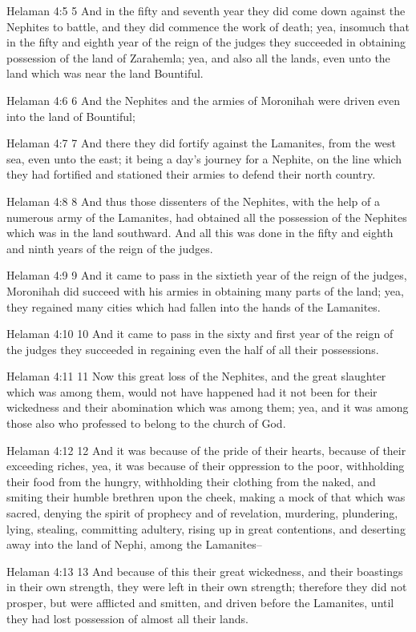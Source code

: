 Helaman 4:5
 5 And in the fifty and seventh year they did come down against
the Nephites to battle, and they did commence the work of death;
yea, insomuch that in the fifty and eighth year of the reign of
the judges they succeeded in obtaining possession of the land of
Zarahemla; yea, and also all the lands, even unto the land which
was near the land Bountiful.

Helaman 4:6
 6 And the Nephites and the armies of Moronihah were driven even
into the land of Bountiful;

Helaman 4:7
 7 And there they did fortify against the Lamanites, from the
west sea, even unto the east; it being a day's journey for a
Nephite, on the line which they had fortified and stationed their
armies to defend their north country.

Helaman 4:8
 8 And thus those dissenters of the Nephites, with the help of a
numerous army of the Lamanites, had obtained all the possession
of the Nephites which was in the land southward. And all this
was done in the fifty and eighth and ninth years of the reign of
the judges.

Helaman 4:9
 9 And it came to pass in the sixtieth year of the reign of the
judges, Moronihah did succeed with his armies in obtaining many
parts of the land; yea, they regained many cities which had
fallen into the hands of the Lamanites.

Helaman 4:10
 10 And it came to pass in the sixty and first year of the reign
of the judges they succeeded in regaining even the half of all
their possessions.

Helaman 4:11
 11 Now this great loss of the Nephites, and the great slaughter
which was among them, would not have happened had it not been for
their wickedness and their abomination which was among them; yea,
and it was among those also who professed to belong to the church
of God.

Helaman 4:12
 12 And it was because of the pride of their hearts, because of
their exceeding riches, yea, it was because of their oppression
to the poor, withholding their food from the hungry, withholding
their clothing from the naked, and smiting their humble brethren
upon the cheek, making a mock of that which was sacred, denying
the spirit of prophecy and of revelation, murdering, plundering,
lying, stealing, committing adultery, rising up in great
contentions, and deserting away into the land of Nephi, among the
Lamanites--

Helaman 4:13
 13 And because of this their great wickedness, and their
boastings in their own strength, they were left in their own
strength; therefore they did not prosper, but were afflicted and
smitten, and driven before the Lamanites, until they had lost
possession of almost all their lands.

